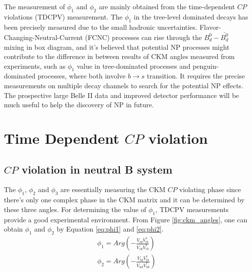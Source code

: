 The measurement of $\phi_1$ and $\phi_2$ are mainly obtained from the time-dependent $CP$ violations (TDCPV) measurement. The $\phi_1$ in the tree-level dominated decays has been precisely measured due to the small hadronic uncertainties. Flavor-Changing-Neutral-Current (FCNC) processes can rise through the $B^0_d-\bar{B^0_d}$ mixing in box diagram, and it's believed that potential NP processes might contribute to the difference in between results of CKM angles measured from experiments, such as $\phi_1$ value in tree-dominated processes and penguin-dominated processes, where both involve $b\to s$ transition. It requires the precise measurements on multiple decay channels to search for the potential NP effects. The prospective large Belle II data and improved detector performance will be much useful to help the discovery of NP in future. 

\section{Time Dependent $CP$ violation}
\subsection{ $CP$ violation in neutral B system}
The  $\phi_1$, $\phi_2$ and $\phi_3$ are essentially measuring the CKM $CP$ violating phase since there's only one complex phase in the CKM matrix and it can be determined by these three angles. 
For determining the value of $\phi_1$, TDCPV measurements provide a good experimental environment.  
From Figure \ref{fig:ckm_angles}, one can obtain $\phi_1$ and $\phi_2$ by Equation \ref{eq:phi1} and \ref{eq:phi2}.
\begin{eqnarray}
\phi_1=Arg(-\frac{V_{td}V^*_{tb}}{V_{cd}V^*_{cb}}) \label{eq:phi1}\\
\phi_2=Arg(-\frac{V_{td}V^*_{tb}}{V_{ud}V^*_{ub}})\label{eq:phi2}
\end{eqnarray}

